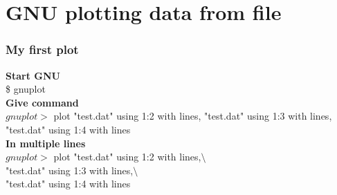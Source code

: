 \documentclass{beamer}
\begin{document}
	\section{GNU plotting data from file}	
		\begin{frame}
			\frametitle{My first plot}
			\textbf{Start GNU}\\
			\$ gnuplot \\[1em]
			\textbf{Give command}\\
			$gnuplot>$ plot "test.dat" using 1:2 with lines,%
			"test.dat" using 1:3 with lines,%
			"test.dat" using 1:4 with lines \\[1em]
			
			\textbf{In multiple lines}\\
	 		$gnuplot>$ plot "test.dat" using 1:2 with lines,$\setminus$ \\
			"test.dat" using 1:3 with lines,$\setminus$ \\
			"test.dat" using 1:4 with lines \\[1em]
		\end{frame}	
\end{document}
